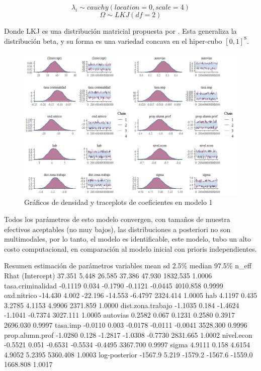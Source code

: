 \documentclass[nojss]{jss}
\begin{document}
$$\lambda_i \sim cauchy(location = 0,scale = 4)$$ 
$$\Omega \sim LKJ(df = 2)$$

Donde LKJ es una distribución matricial propuesta por \cite{LKJ2009}. Esta generaliza la distribución beta, y su forma es una variedad concava en el hiper-cubo $[0,1]^8$.


\begin{figure}[H]
	\centering
	\includegraphics[scale=0.8]{images/traceplot2}
	\caption[trace1]{Gráficos de densidad y traceplots de coeficientes en modelo 1}
	\label{fig:fig7}
\end{figure}

Todos los parámetros de esto modelo convergen, con tamaños de muestra efectivos aceptables (no muy bajos), las distribuciones a posteriori no son multimodales, por lo tanto, el modelo es identificable, este modelo, tubo un alto costo computacional, en comparación al modelo inicial con prioris independientes. 

\begin{CodeChunk}	
\begin{CodeOutput}
	                Resumen estimación de parámetros
variables            mean  sd     2.5\%  median   97.5\%   n_eff    Rhat
(Intercept)        37.351 5.448  26.585  37.386  47.930 1832.535  1.0006
tasa.criminalidad -0.1119 0.034 -0.1790 -0.1121 -0.0445 4010.858  0.9999
oxd.nitrico       -14.430 4.002 -22.196 -14.553 -6.4797 2324.414  1.0005
hab                4.1197 0.435  3.2785  4.1153  4.9906 2371.859  1.0000
dist.zona.trabajo -1.1035 0.184 -1.4624 -1.1041 -0.7374 3027.111  1.0005
autovias           0.2582 0.067  0.1231  0.2580  0.3917 2696.030  0.9997
tasa.imp          -0.0110 0.003 -0.0178 -0.0111 -0.0041 3528.300  0.9996
prop.alumn.prof   -1.0280 0.128 -1.2817 -1.0308 -0.7730 2831.665  1.0002
nivel.econ        -0.5521 0.051 -0.6531 -0.5534 -0.4495 3367.700  0.9997
sigma              4.9111 0.158  4.6154  4.9052  5.2395 5360.408  1.0003
log-posterior     -1567.9 5.219 -1579.2 -1567.6 -1559.0 1668.808  1.0017 
\end{CodeOutput}
\end{CodeChunk}
\end{document}

